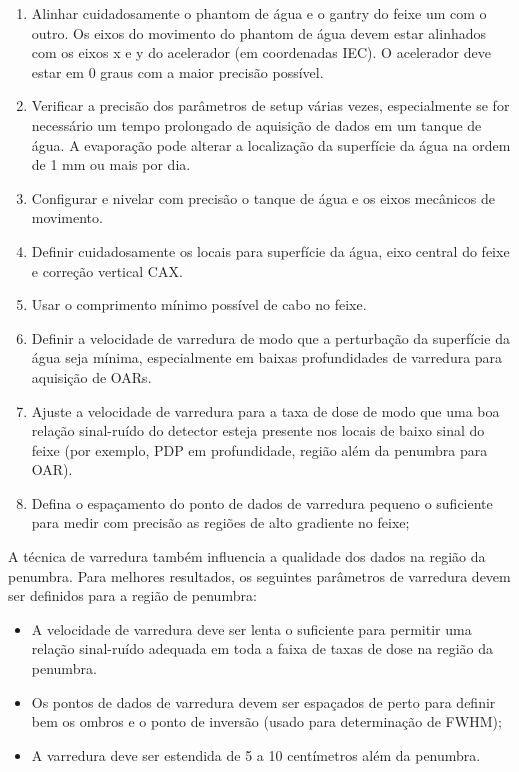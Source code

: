 \documentclass[11pt,a4paper]{article}
\newcounter{exemplo}
\begin{document}
	\begin{enumerate}[label=\textcolor{CarnationPink}{\arabic*${}^\circ $}]
		\item Alinhar cuidadosamente o phantom de água e o gantry do feixe um com o outro. Os eixos do movimento do phantom de água devem estar alinhados com os eixos x e y do acelerador (em coordenadas IEC). O acelerador deve estar em 0 graus com a maior precisão possível.
		
		\item Verificar a precisão dos parâmetros de setup várias vezes, especialmente se for necessário um tempo prolongado de aquisição de dados em um tanque de água. A evaporação pode alterar a localização da superfície da água na ordem de 1 mm ou mais por dia.
		
		\item Configurar e nivelar com precisão o tanque de água e os eixos mecânicos de movimento.
		
		\item Definir cuidadosamente os locais para superfície da água, eixo central do feixe e correção vertical CAX.
		
		\item Usar o comprimento mínimo possível de cabo no feixe.
		
		\item Definir a velocidade de varredura de modo que a perturbação da superfície da água seja mínima, especialmente em baixas profundidades de varredura para aquisição de OARs.
		
		\item Ajuste a velocidade de varredura para a taxa de dose de modo que uma boa relação sinal-ruído do detector esteja presente nos locais de baixo sinal do feixe (por exemplo, PDP em profundidade, região além da penumbra para OAR).
		
		\item Defina o espaçamento do ponto de dados de varredura pequeno o suficiente para medir com precisão as regiões de alto gradiente no feixe;
	\end{enumerate}

	A técnica de varredura também influencia a qualidade dos dados na região da penumbra. Para melhores resultados, os seguintes parâmetros de varredura devem ser definidos para a região de penumbra:

	\begin{itemize}[label=\textcolor{CarnationPink}{$\star$}]
		\item A velocidade de varredura deve ser lenta o suficiente para permitir uma relação sinal-ruído adequada em toda a faixa de taxas de dose na região da penumbra.
		\item Os pontos de dados de varredura devem ser espaçados de perto para definir bem os ombros e o ponto de inversão (usado para determinação de FWHM);
		\item A varredura deve ser estendida de 5 a 10 centímetros além da penumbra.
	\end{itemize}
\end{document}
